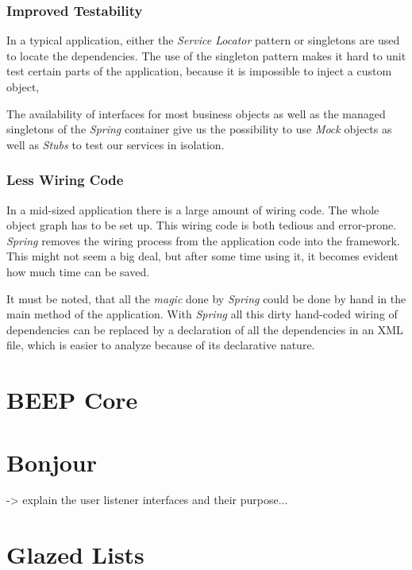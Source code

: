 \subsubsection{Improved Testability}
In a typical application, either the \emph{Service Locator} pattern 
or singletons are used to locate the dependencies. The use of the singleton
pattern makes it hard to unit test certain parts of the
application, because it is impossible to inject a custom object,

The availability of interfaces for most business objects as well as the
managed singletons of the \emph{Spring} container give us the possibility
to use \emph{Mock} objects as well as \emph{Stubs} to test our services
in isolation.

\subsubsection{Less Wiring Code}
In a mid-sized application there is a large amount of wiring code. The whole
object graph has to be set up. This wiring code is both tedious and
error-prone. \emph{Spring} removes the wiring process from the application
code into the framework. This might not seem a big deal, but after some time
using it, it becomes evident how much time can be saved.

It must be noted, that all the \emph{magic} done by \emph{Spring} could be
done by hand in the main method of the application. With \emph{Spring} all
this dirty hand-coded wiring of dependencies can be replaced by a 
declaration of all the dependencies in an XML file, which is easier to
analyze because of its declarative nature.



\section{BEEP Core}


\section{Bonjour}
-> explain the user listener interfaces and their purpose...


\section{Glazed Lists}

